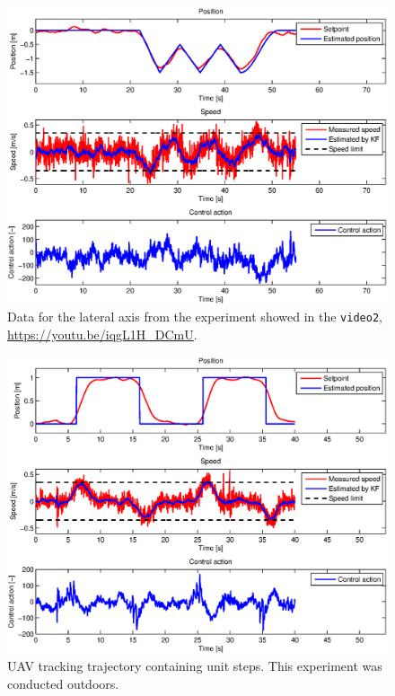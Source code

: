 \begin{figure}[H]
\centering
\begin{sideways}
\includegraphics[scale=0.99]{fig/experiment_outdoor_1_ape.eps}
\end{sideways}
\caption*{Data for the lateral axis from the experiment showed in the \texttt{video2}, \url{https://youtu.be/iqgL1H_DCmU}.}
\end{figure}

\begin{figure}[H]
\centering
\begin{sideways}
\includegraphics[scale=0.99]{fig/experiment_steps_ape.eps}
\end{sideways}
\caption*{UAV tracking trajectory containing unit steps. This experiment was conducted outdoors.}
\end{figure}